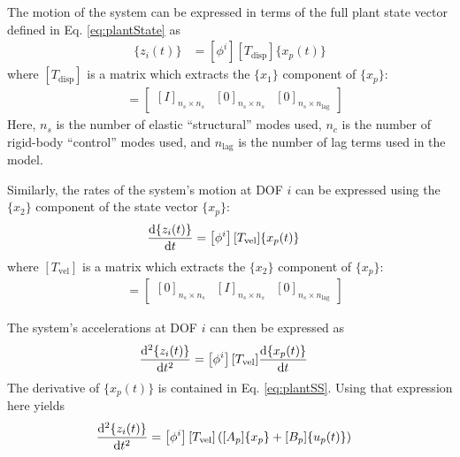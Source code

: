 The motion of the system can be expressed in terms of the full plant state vector defined in Eq. \ref{eq:plantState} as
\begin{align}
	\label{eq:positionOut}
	\{z_i(t)\} &= \left[ \phi^i \right] [T_\text{disp}] \{x_p(t)\}
\end{align}
where $[T_\text{disp}]$ is a matrix which extracts the $\{x_1\}$ component of $\{x_p\}$:
\begin{align}
	[T_\text{disp}] &= \begin{bmatrix} [I]_{n_s \times n_s} & [0]_{n_s \times n_s} & [0]_{n_s \times n_\text{lag}} \end{bmatrix}
\end{align}
Here, $n_s$ is the number of elastic ``structural'' modes used, $n_c$ is the number of rigid-body ``control'' modes used, and $n_\text{lag}$ is the number of lag terms used in the model.

Similarly, the rates of the system's motion at DOF $i$ can be expressed using the $\{x_2\}$ component of the state vector $\{x_p\}$:
\begin{align}
	\label{eq:velocityOut}
	\frac{\mathrm{d} \{z_i(t)\}}{\mathrm{d} t} &= \left[ \phi^i \right] [T_\text{vel}] \{x_p(t)\}
\end{align}
where $[T_\text{vel}]$ is a matrix which extracts the $\{x_2\}$ component of $\{x_p\}$:
\begin{align}
	[T_\text{vel}] &= \begin{bmatrix} [0]_{n_s \times n_s} & [I]_{n_s \times n_s} & [0]_{n_s \times n_\text{lag}} \end{bmatrix}
\end{align}

The system's accelerations at DOF $i$ can then be expressed as
\begin{align}
	\frac{\mathrm{d} ^2\{z_i(t)\}}{\mathrm{d} t^2} &= \left[ \phi^i \right] [T_\text{vel}] \frac{\mathrm{d} \{x_p(t)\}}{\mathrm{d} t}
\end{align}
The derivative of $\{x_p(t)\}$ is contained in Eq. \ref{eq:plantSS}. Using that expression here yields
\begin{align}
	\frac{\mathrm{d} ^2\{z_i(t)\}}{\mathrm{d} t^2} &= \left[ \phi^i \right] [T_\text{vel}]
	\left( [A_p] \{x_p\} + [B_p] \{u_p(t)\} \right)
\end{align}

